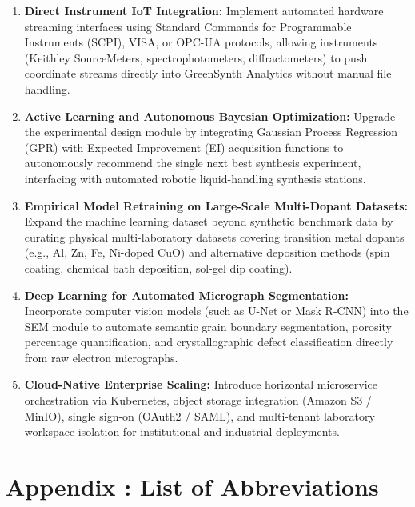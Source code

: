 \documentclass[12pt,a4paper,oneside]{report}
\begin{document}
{{{\begin{enumerate}
    \item \textbf{Direct Instrument IoT Integration:} Implement automated hardware streaming interfaces using Standard Commands for Programmable Instruments (SCPI), VISA, or OPC-UA protocols, allowing instruments (Keithley SourceMeters, spectrophotometers, diffractometers) to push coordinate streams directly into GreenSynth Analytics without manual file handling.
    \item \textbf{Active Learning and Autonomous Bayesian Optimization:} Upgrade the experimental design module by integrating Gaussian Process Regression (GPR) with Expected Improvement (EI) acquisition functions to autonomously recommend the single next best synthesis experiment, interfacing with automated robotic liquid-handling synthesis stations.
    \item \textbf{Empirical Model Retraining on Large-Scale Multi-Dopant Datasets:} Expand the machine learning dataset beyond synthetic benchmark data by curating physical multi-laboratory datasets covering transition metal dopants (e.g., Al, Zn, Fe, Ni-doped $\text{CuO}$) and alternative deposition methods (spin coating, chemical bath deposition, sol-gel dip coating).
    \item \textbf{Deep Learning for Automated Micrograph Segmentation:} Incorporate computer vision models (such as U-Net or Mask R-CNN) into the SEM module to automate semantic grain boundary segmentation, porosity percentage quantification, and crystallographic defect classification directly from raw electron micrographs.
    \item \textbf{Cloud-Native Enterprise Scaling:} Introduce horizontal microservice orchestration via Kubernetes, object storage integration (Amazon S3 / MinIO), single sign-on (OAuth2 / SAML), and multi-tenant laboratory workspace isolation for institutional and industrial deployments.
\end{enumerate}


\thispagestyle{empty}
\appendix
\chapter{Appendix : List of Abbreviations}

}}}
\end{document}
